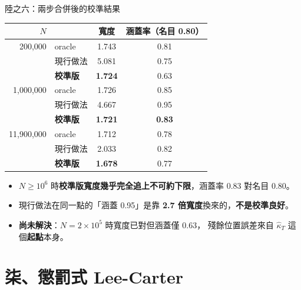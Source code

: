\documentclass[aspectratio=169, UTF8, fontset=macnew, 11pt]{ctexbeamer}
\newcommand{\hi}[1]{\textcolor{red!70!black}{\textbf{#1}}}
\newcommand{\gd}[1]{\textcolor{green!45!black}{\textbf{#1}}}
\begin{document}
\begin{frame}{陸之六：兩步合併後的校準結果}
\begin{center}\small
\begin{tabular}{rlcc}
\toprule
$N$ & & 寬度 & 涵蓋率（名目 0.80）\\
\midrule
200,000 & oracle & 1.743 & 0.81\\
 & 現行做法 & 5.081 & 0.75\\
 & \gd{校準版} & \gd{1.724} & 0.63\\
\midrule
1,000,000 & oracle & 1.726 & 0.85\\
 & 現行做法 & 4.667 & 0.95\\
 & \gd{校準版} & \gd{1.721} & \gd{0.83}\\
\midrule
11,900,000 & oracle & 1.712 & 0.78\\
 & 現行做法 & 2.033 & 0.82\\
 & \gd{校準版} & \gd{1.678} & 0.77\\
\bottomrule
\end{tabular}
\end{center}
\vspace{8pt}
\begin{itemize}\small
  \item $N\ge10^6$ 時\gd{校準版寬度幾乎完全追上不可約下限}，涵蓋率 0.83 對名目 0.80。
  \item 現行做法在同一點的「涵蓋 0.95」是靠 \hi{2.7 倍寬度}換來的，\textbf{不是校準良好}。
  \item \textbf{尚未解決}：$N=2\times10^5$ 時寬度已對但涵蓋僅 0.63，
        殘餘位置誤差來自 $\hat\kappa_T$ 這個\textbf{起點}本身。
\end{itemize}
\end{frame}

\section{柒、懲罰式 Lee-Carter}
\end{document}
